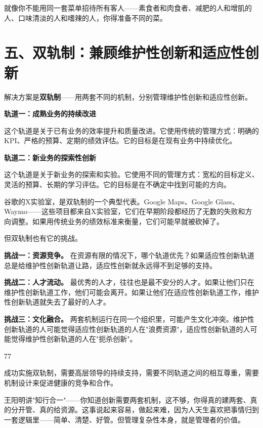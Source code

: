 就像你不能用同一套菜单招待所有客人——素食者和肉食者、减肥的人和增肌的人、口味清淡的人和嗜辣的人，你得准备不同的菜。

\section{五、双轨制：兼顾维护性创新和适应性创新}


解决方案是\textbf{双轨制}——用两套不同的机制，分别管理维护性创新和适应性创新。

\textbf{轨道一：成熟业务的持续改进}

这个轨道是关于已有业务的效率提升和质量改进。它使用传统的管理方式：明确的KPI、严格的预算、定期的绩效评估。它的目标是在现有业务中持续优化。

\textbf{轨道二：新业务的探索性创新}

这个轨道是关于新业务的探索和实验。它使用不同的管理方式：宽松的目标定义、灵活的预算、长期的学习评估。它的目标是在不确定中找到可能的方向。

谷歌的X实验室，是双轨制的一个典型代表。Google Maps、Google Glass、Waymo——这些项目都来自X实验室，它们在早期阶段都经历了无数的失败和方向调整。如果用传统业务的绩效标准来衡量，它们可能早就被砍掉了。

但双轨制也有它的挑战。

\textbf{挑战一：资源竞争。} 在资源有限的情况下，哪个轨道优先？如果适应性创新轨道总是给维护性创新轨道让路，适应性创新就永远得不到足够的支持。

\textbf{挑战二：人才流动。} 最优秀的人才，往往也是最不安分的人才。如果让他们只在维护性创新轨道工作，他们可能会离开。如果让他们在适应性创新轨道工作，维护性创新轨道就失去了最好的人才。

\textbf{挑战三：文化融合。} 两套机制运行在同一个组织里，可能产生文化冲突。维护性创新轨道的人可能觉得适应性创新轨道的人在"浪费资源"，适应性创新轨道的人可能觉得维护性创新轨道的人在"扼杀创新"。

77%

成功实施双轨制，需要高层领导的持续支持，需要不同轨道之间的相互尊重，需要机制设计来促进健康的竞争和合作。

王阳明讲"知行合一"——你知道创新需要两套机制，这不够，你得真的建两套、真的分开管、真的给资源。这事说起来容易，做起来难，因为人天生喜欢把事情归到一套逻辑里——简单、清楚、好管。但管理复杂性本身，就是管理者的价值。

